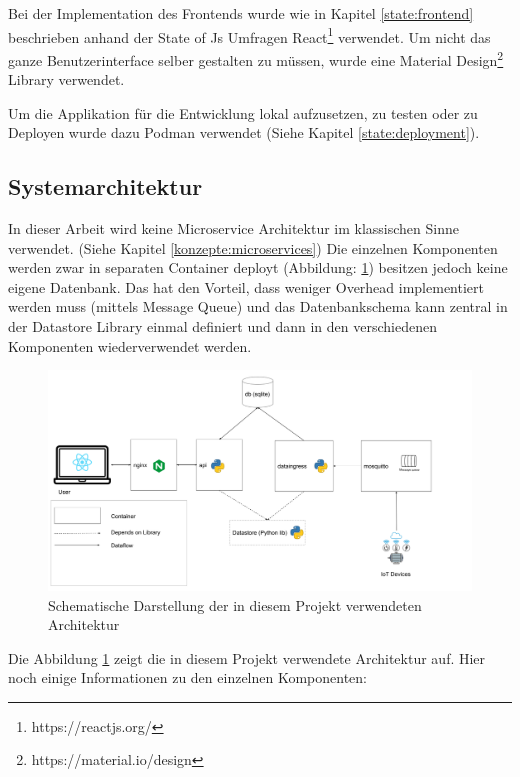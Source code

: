 Bei der Implementation des Frontends wurde wie in Kapitel \ref{state:frontend} beschrieben
anhand der State of Js Umfragen React\footnote{https://reactjs.org/} verwendet.
Um nicht das ganze Benutzerinterface selber gestalten zu müssen, wurde eine Material Design\footnote{https://material.io/design}
Library verwendet.

Um die Applikation für die Entwicklung lokal aufzusetzen, zu testen oder zu Deployen wurde dazu
Podman verwendet (Siehe Kapitel \ref{state:deployment}).


\subsection{Systemarchitektur}
\label{architekturentscheidung}

In dieser Arbeit wird keine Microservice Architektur im klassischen Sinne verwendet. (Siehe Kapitel \ref{konzepte:microservices})
Die einzelnen Komponenten werden zwar in separaten Container deployt (Abbildung: \ref{fig:smic-arch})
besitzen jedoch keine eigene Datenbank.
Das hat den Vorteil, dass weniger Overhead implementiert werden muss (mittels Message Queue)
und das Datenbankschema kann zentral in der Datastore Library einmal definiert
und dann in den verschiedenen Komponenten wiederverwendet werden.


\begin{figure}[h]
    \centering
    \includegraphics[width=1.0\textwidth]{gfx/smic-arch}
    \caption{
        Schematische Darstellung der in diesem Projekt verwendeten Architektur
    }
    \label{fig:smic-arch}
\end{figure}

Die Abbildung \ref{fig:smic-arch} zeigt die in diesem Projekt verwendete
Architektur auf. Hier noch einige Informationen zu den einzelnen Komponenten:


